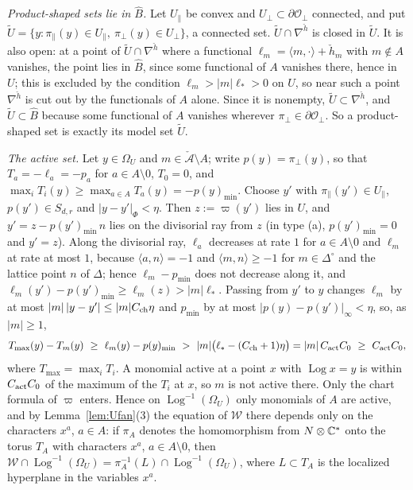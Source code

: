 \emph{Product-shaped sets lie in $\widehat B$.} Let $U_\parallel$ be convex and $U_\perp\subset\partial \mathcal O_\perp$ connected, and put $\widetilde U=\{y:\pi_\parallel(y)\in U_\parallel,\ \pi_\perp(y)\in U_\perp\}$, a connected set. $\widetilde U\cap\nabla^{\check h}$ is closed in $\widetilde U$. It is also open: at a point of $\widetilde U\cap\nabla^{\check h}$ where a functional $\ell_m=\langle m,\cdot\rangle+\check h_m$ with $m\notin A$ vanishes, the point lies in $\widehat B$, since some functional of $A$ vanishes there, hence in $U$; this is excluded by the condition $\ell_m>|m|\ell_*>0$ on $U$, so near such a point $\nabla^{\check h}$ is cut out by the functionals of $A$ alone. Since it is nonempty, $\widetilde U\subset\nabla^{\check h}$, and $\widetilde U\subset\widehat B$ because some functional of $A$ vanishes wherever $\pi_\perp\in\partial \mathcal O_\perp$. So a product-shaped set is exactly its model set $\widetilde U$.

\emph{The active set.} Let $y\in\Omega_U$ and $m\in\check{\mathcal A}\setminus A$; write $p(y)=\pi_\perp(y)$, so that $T_a=-\ell_a=-p_a$ for $a\in A\setminus0$, $T_0=0$, and $\max_iT_i(y)\ge\max_{a\in A}T_a(y)=-p(y)_{\min}$. Choose $y'$ with $\pi_\parallel(y')\in U_\parallel$, $p(y')\in S_{d,r}$ and $|y-y'|_\Phi<\eta$. Then $z:=\varpi(y')$ lies in $U$, and $y'=z-p(y')_{\min}\,n$ lies on the divisorial ray from $z$ (in type (a), $p(y')_{\min}=0$ and $y'=z$). Along the divisorial ray, $\ell_a$ decreases at rate $1$ for $a\in A\setminus0$ and $\ell_m$ at rate at most $1$, because $\langle a,n\rangle=-1$ and $\langle m,n\rangle\ge-1$ for $m\in\Delta^\circ$ and the lattice point $n$ of $\Delta$; hence $\ell_m-p_{\min}$ does not decrease along it, and $\ell_m(y')-p(y')_{\min}\ge\ell_m(z)>|m|\ell_*$. Passing from $y'$ to $y$ changes $\ell_m$ by at most $|m|\,|y-y'|\le|m|C_{\rm ch}\eta$ and $p_{\min}$ by at most $|p(y)-p(y')|_\infty<\eta$, so, as $|m|\ge1$,
\[
T_{\max}(y)-T_m(y)\ \ge\ \ell_m(y)-p(y)_{\min}\ >\ |m|\bigl(\ell_*-(C_{\rm ch}+1)\eta\bigr)=|m|\,C_{\rm act}C_0\ \ge\ C_{\rm act}C_0,
\]
where $T_{\max}=\max_iT_i$. A monomial active at a point $x$ with $\operatorname{Log}x=y$ is within $C_{\rm act}C_0$ of the maximum of the $T_i$ at $x$, so $m$ is not active there. Only the chart formula of $\varpi$ enters. Hence on $\operatorname{Log}^{-1}(\Omega_U)$ only monomials of $A$ are active, and by Lemma~\ref{lem:Ufan}(3) the equation of $\mathscr W$ there depends only on the characters $x^a$, $a\in A$: if $\pi_A$ denotes the homomorphism from $N\otimes\mathbb C^*$ onto the torus $T_A$ with characters $x^a$, $a\in A\setminus0$, then $\mathscr W\cap\operatorname{Log}^{-1}(\Omega_U)=\pi_A^{-1}(L)\cap\operatorname{Log}^{-1}(\Omega_U)$, where $L\subset T_A$ is the localized hyperplane in the variables $x^a$.

